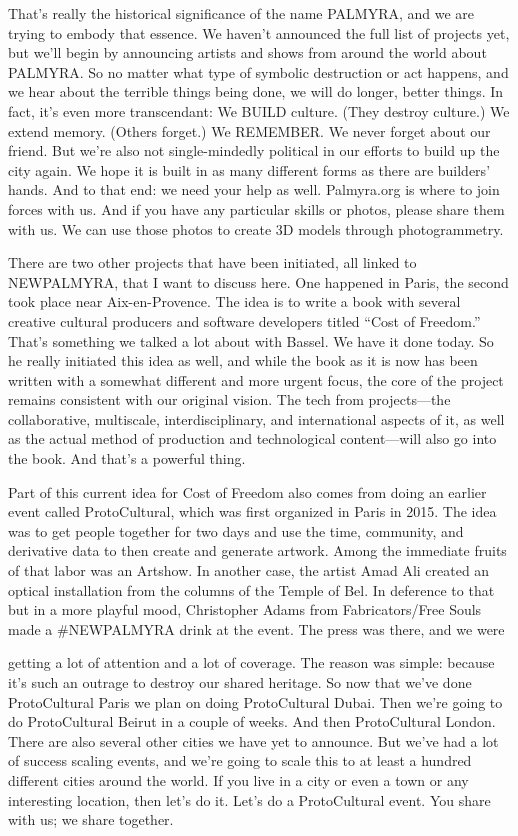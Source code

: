 That's really the historical significance of the name PALMYRA, and we
are trying to embody that essence. We haven't announced the full list of
projects yet, but we'll begin by announcing artists and shows from
around the world about PALMYRA. So no matter what type of symbolic
destruction or act happens, and we hear about the terrible things being
done, we will do longer, better things. In fact, it's even more
transcendant: We BUILD culture. (They destroy culture.) We extend
memory. (Others forget.) We REMEMBER. We never forget about our friend.
But we're also not single-mindedly political in our efforts to build up
the city again. We hope it is built in as many different forms as there
are builders' hands. And to that end: we need your help as well.
Palmyra.org is where to join forces with us. And if you have any
particular skills or photos, please share them with us. We can use those
photos to create 3D models through photogrammetry.

There are two other projects that have been initiated, all linked to
NEWPALMYRA, that I want to discuss here. One happened in Paris, the
second took place near Aix-en-Provence. The idea is to write a book with
several creative cultural producers and software developers titled
``Cost of Freedom.'' That's something we talked a lot about with Bassel.
We have it done today. So he really initiated this idea as well, and
while the book as it is now has been written with a somewhat different
and more urgent focus, the core of the project remains consistent with
our original vision. The tech from projects---the collaborative,
multiscale, interdisciplinary, and international aspects of it, as well
as the actual method of production and technological content---will also
go into the book. And that's a powerful thing.

Part of this current idea for Cost of Freedom also comes from doing an
earlier event called ProtoCultural, which was first organized in Paris
in 2015. The idea was to get people together for two days and use the
time, community, and derivative data to then create and generate
artwork. Among the immediate fruits of that labor was an Artshow. In
another case, the artist Amad Ali created an optical installation from
the columns of the Temple of Bel. In deference to that but in a more
playful mood, Christopher Adams from Fabricators/Free Souls made a
\#NEWPALMYRA drink at the event. The press was there, and we were

getting a lot of attention and a lot of coverage. The reason was simple:
because it's such an outrage to destroy our shared heritage. So now that
we've done ProtoCultural Paris we plan on doing ProtoCultural Dubai.
Then we're going to do ProtoCultural Beirut in a couple of weeks. And
then ProtoCultural London. There are also several other cities we have
yet to announce. But we've had a lot of success scaling events, and
we're going to scale this to at least a hundred different cities around
the world. If you live in a city or even a town or any interesting
location, then let's do it. Let's do a ProtoCultural event. You share
with us; we share together.

